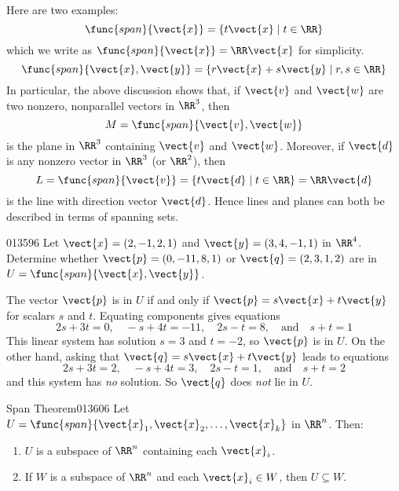 \noindent Here are two examples:
\begin{equation*}
\func{span}\{ \vect{x} \} = \{t\vect{x} \mid t \in \RR\}
\end{equation*}
which we write as $\func{span}\{\vect{x}\} = \RR \vect{x}$ for simplicity.
\begin{equation*}
\func{span}\{\vect{x}, \vect{y}\} = \{r\vect{x} + s\vect{y} \mid  r, s \in \RR \}
\end{equation*}
In particular, the above discussion shows that, if $\vect{v}$ and $\vect{w}$ are two nonzero, nonparallel vectors in $\RR^3$, then
\begin{equation*}
M = \func{span}\{\vect{v}, \vect{w} \}
\end{equation*}
is the plane in $\RR^3$ containing $\vect{v}$ and $\vect{w}$. Moreover, if $\vect{d}$ is any nonzero vector in $\RR^3$ (or $\RR^2$), then
\begin{equation*}
L = \func{span} \{\vect{v}\} = \{t\vect{d} \mid t \in \RR\} = \RR\vect{d}
\end{equation*}
is the line with direction vector $\vect{d}$. Hence lines and planes can both be described in terms of spanning sets.

\begin{example}{}{013596}
Let $\vect{x} = (2, -1, 2, 1)$ and $\vect{y} = (3, 4, -1, 1)$ in $\RR^4$. Determine whether $\vect{p} = (0, -11, 8, 1)$ or $\vect{q} = (2, 3, 1, 2)$ are in $U = \func{span}\{\vect{x}, \vect{y}\}$.

\begin{solution}
The vector $\vect{p}$ is in $U$ if and only if $\vect{p} = s\vect{x} + t\vect{y}$ for scalars $s$ and $t$. Equating components gives equations
\begin{equation*}
2s + 3t = 0, \quad -s + 4t = -11, \quad 2s - t = 8, \quad \mbox{and} \quad s + t = 1
\end{equation*}
This linear system has solution $s = 3$ and $t = -2$, so $\vect{p}$ is in $U$. On the other hand, asking that $\vect{q} = s\vect{x} + t\vect{y}$ leads to equations
\begin{equation*}
2s + 3t = 2, \quad -s +4t = 3, \quad 2s -t = 1, \quad \mbox{and} \quad s + t = 2
\end{equation*}
and this system has \textit{no} solution. So $\vect{q}$ does \textit{not} lie in $U$.
\end{solution}
\end{example}

\vspace*{-1em}
\begin{theorem}{Span Theorem}{013606}
Let $U = \func{span}\{\vect{x}_{1}, \vect{x}_{2}, \dots, \vect{x}_{k}\}$ in $\RR^n$. Then:

\begin{enumerate}
\item $U$ is a subspace of $\RR^n$ containing each $\vect{x}_{i}$.

\item If $W$ is a subspace of $\RR^n$ and each $\vect{x}_{i} \in W$, then $U \subseteq W$.

\end{enumerate}
\end{theorem}

